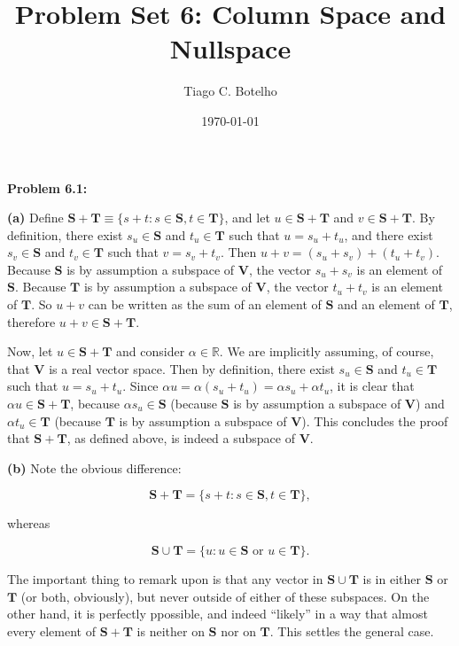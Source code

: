 \documentclass{article}
\title{Problem Set 6: Column Space and Nullspace}
\author{Tiago C. Botelho}
\date{\today}
\begin{document}
\maketitle

\noindent \textbf{Problem 6.1:}

\noindent \textbf{(a)} Define $\mathbf{S + T} \equiv \{s + t: s \in \mathbf{S}, t \in \mathbf{T}\}$, and let $u \in \mathbf{S + T}$ and $v \in \mathbf{S + T}$. By definition, there exist $s_u \in \mathbf{S}$ and $t_u \in \mathbf{T}$ such that $u = s_u + t_u$, and there exist $s_v \in \mathbf{S}$ and $t_v \in \mathbf{T}$ such that $v = s_v + t_v$. Then $u + v = (s_u + s_v) + (t_u + t_v)$. Because $\mathbf{S}$ is by assumption a subspace of $\mathbf{V}$, the vector $s_u + s_v$ is an element of $\mathbf{S}$. Because $\mathbf{T}$ is by assumption a subspace of $\mathbf{V}$, the vector $t_u + t_v$ is an element of $\mathbf{T}$. So $u + v$ can be written as the sum of an element of $\mathbf{S}$ and an element of $\mathbf{T}$, therefore $u + v \in \mathbf{S + T}$.

Now, let $u \in \mathbf{S + T}$ and consider $\alpha \in \mathbb{R}$. We are implicitly assuming, of course, that $\mathbf{V}$ is a real vector space. Then by definition, there exist $s_u \in \mathbf{S}$ and $t_u \in \mathbf{T}$ such that $u = s_u + t_u$. Since $\alpha u = \alpha (s_u + t_u) = \alpha s_u + \alpha t_u$, it is clear that $\alpha u \in \mathbf{S + T}$, because $\alpha s_u \in \mathbf{S}$ (because $\mathbf{S}$ is by assumption a subspace of $\mathbf{V}$) and $\alpha t_u \in \mathbf{T}$ (because $\mathbf{T}$ is by assumption a subspace of $\mathbf{V}$). This concludes the proof that $\mathbf{S + T}$, as defined above, is indeed a subspace of $\mathbf{V}$.

\noindent \textbf{(b)} Note the obvious difference:

\[
\mathbf{S + T} = \{s + t: s \in \mathbf{S}, t \in \mathbf{T}\},
\]

whereas

\[
\mathbf{S} \cup \mathbf{T} = \{u: u \in \mathbf{S} \text{ or } u \in \mathbf{T}\}.
\]

The important thing to remark upon is that any vector in $\mathbf{S} \cup \mathbf{T}$ is in either $\mathbf{S}$ or $\mathbf{T}$ (or both, obviously), but never outside of either of these subspaces. On the other hand, it is perfectly ppossible, and indeed ``likely'' in a way that almost every element of $\mathbf{S + T}$ is neither on $\mathbf{S}$ nor on $\mathbf{T}$. This settles the general case.
\end{document}
